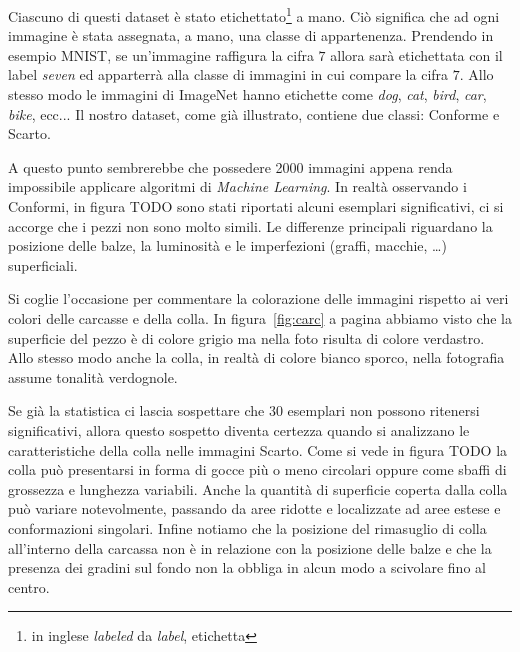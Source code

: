 Ciascuno di questi dataset è stato etichettato\footnote{in inglese \textit{labeled} da \textit{label}, etichetta} a mano.
Ciò significa che ad ogni immagine è stata assegnata, a mano, una classe di appartenenza.
Prendendo in esempio MNIST, se un'immagine raffigura la cifra $7$ allora sarà etichettata con il label \textit{seven} ed apparterrà alla classe di immagini in cui compare la cifra $7$.
Allo stesso modo le immagini di ImageNet hanno etichette come \textit{dog}, \textit{cat}, \textit{bird}, \textit{car}, \textit{bike}, ecc... %
Il nostro dataset, come già illustrato, contiene due classi: Conforme e Scarto.

A questo punto sembrerebbe che possedere 2000 immagini appena renda impossibile applicare algoritmi di \textit{Machine Learning}.
In realtà osservando i Conformi, in figura TODO sono stati riportati alcuni esemplari significativi, ci si accorge che i pezzi non sono molto simili.
Le differenze principali riguardano la posizione delle balze, la luminosità e le imperfezioni (graffi, macchie, \dots) superficiali.

Si coglie l'occasione per commentare la colorazione delle immagini rispetto ai veri colori delle carcasse e della colla.
In figura~\ref{fig:carc} a pagina \pageref{fig:carc} abbiamo visto che la superficie del pezzo è di colore grigio ma nella foto risulta di colore verdastro.
Allo stesso modo anche la colla, in realtà di colore bianco sporco, nella fotografia assume tonalità verdognole.




Se già la statistica ci lascia sospettare che $30$ esemplari non possono ritenersi significativi, allora questo sospetto diventa certezza quando si analizzano le caratteristiche della colla nelle immagini Scarto.  
Come si vede in figura TODO
la colla può presentarsi in forma di gocce più o meno circolari oppure come sbaffi di grossezza e lunghezza variabili.
Anche la quantità di superficie coperta dalla colla può variare notevolmente, passando da aree ridotte e localizzate ad aree estese e conformazioni singolari.
Infine notiamo che la posizione del rimasuglio di colla all'interno della carcassa non è in relazione con la posizione delle balze e che la presenza dei gradini sul fondo non la obbliga in alcun modo a scivolare fino al centro.

